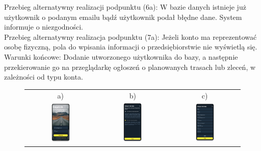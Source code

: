 Przebieg alternatywny realizacji podpunktu (6a): W bazie danych istnieje już użytkownik o podanym emailu bądź użytkownik podał błędne dane. System informuje o niezgodności. \\
Przebieg alternatywny realizacja podpunktu (7a): Jeżeli konto ma reprezentować osobę fizyczną, pola do wpisania informacji o przedsiębiorstwie nie wyświetlą się. \\
Warunki końcowe: Dodanie utworzonego użytkownika do bazy, a następnie przekierowanie go na przeglądarkę ogłoszeń o planowanych trasach lub zleceń, w zależności od typu konta.
\begin{figure}[H]
 \centering
  \begin{tabular}{@{}ccc@{}}
  a) & b) & c)\\
  \includegraphics[width=0.3\textwidth]{rozdzial1/logowanie_m.png} &
  \includegraphics[width=0.3\textwidth]{rozdzial1/wybor_1_m.png} &
  \includegraphics[width=0.3\textwidth]{rozdzial1/rejestracja_m.png}

\end{tabular}
\end{figure}
